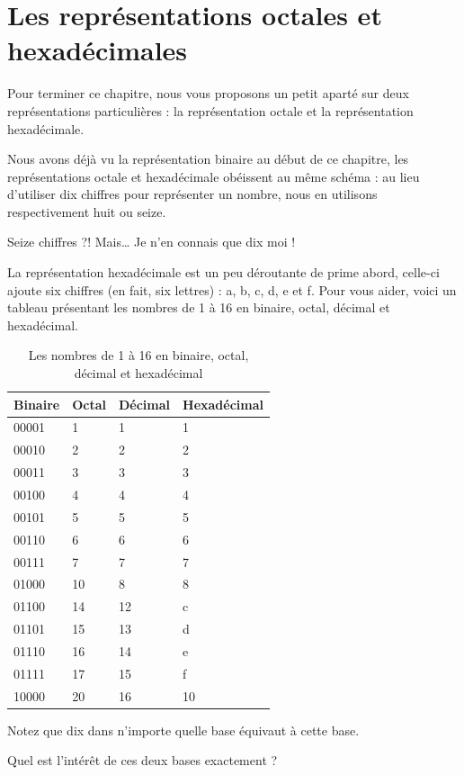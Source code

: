 \section{Les représentations octales et hexadécimales }

Pour terminer ce chapitre, nous vous proposons un petit aparté sur
deux représentations particulières : la représentation octale et la
représentation hexadécimale.

Nous avons déjà vu la représentation binaire au début de ce chapitre,
les représentations octale et hexadécimale obéissent au même schéma :
au lieu d'utiliser dix chiffres pour représenter un nombre, nous en
utilisons respectivement huit ou seize.

\begin{questionbox}
  Seize chiffres ?! Mais\ldots{} Je n'en connais que dix moi !
\end{questionbox}

La représentation hexadécimale est un peu déroutante de prime abord,
celle-ci ajoute six chiffres (en fait, six lettres) : a, b, c, d, e et
f. Pour vous aider, voici un tableau présentant les nombres de 1 à 16
en binaire, octal, décimal et hexadécimal.

\begin{table}[ht!]
\centering
{}
\begin{tabular}{|l|l|l|l|}\hline
\rowcolor{gris-tab-entete}\textbf{Binaire} & \textbf{Octal} & \textbf{Décimal} & \textbf{Hexadécimal}\tabularnewline\hline
00001 & 1 & 1 & 1\tabularnewline\hline
00010 & 2 & 2 & 2\tabularnewline\hline
00011 & 3 & 3 & 3\tabularnewline\hline
00100 & 4 & 4 & 4\tabularnewline\hline
00101 & 5 & 5 & 5\tabularnewline\hline
00110 & 6 & 6 & 6\tabularnewline\hline
00111 & 7 & 7 & 7\tabularnewline\hline
01000 & 10 & 8 & 8\tabularnewline\hline
01100 & 14 & 12 & c\tabularnewline\hline
01101 & 15 & 13 & d\tabularnewline\hline
01110 & 16 & 14 & e\tabularnewline\hline
01111 & 17 & 15 & f\tabularnewline\hline
10000 & 20 & 16 & 10\tabularnewline\hline
\end{tabular}
\caption{Les nombres de 1 à 16 en binaire, octal, décimal et hexadécimal}
\end{table}

\begin{infobox}
  Notez que dix dans n'importe quelle base équivaut à cette base.
\end{infobox}

\begin{questionbox}
  Quel est l'intérêt de ces deux bases exactement ?
\end{questionbox}
  

